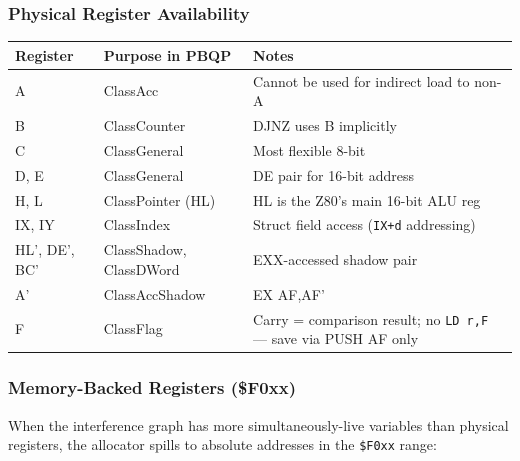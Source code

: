 \documentclass[
  11pt,
  a4paper,
]{report}
\begin{document}
\subsubsection{Physical Register
Availability}\label{physical-register-availability}

\begin{longtable}[]{@{}
  >{\raggedright\arraybackslash}p{}
  >{\raggedright\arraybackslash}p{}
  >{\raggedright\arraybackslash}p{}@{}}
\toprule\noalign{}
\begin{minipage}[b]{\linewidth}\raggedright
Register
\end{minipage} & \begin{minipage}[b]{\linewidth}\raggedright
Purpose in PBQP
\end{minipage} & \begin{minipage}[b]{\linewidth}\raggedright
Notes
\end{minipage} \\
\midrule\noalign{}
\endhead
\bottomrule\noalign{}
\endlastfoot
A & ClassAcc & Cannot be used for indirect load to non-A \\
B & ClassCounter & DJNZ uses B implicitly \\
C & ClassGeneral & Most flexible 8-bit \\
D, E & ClassGeneral & DE pair for 16-bit address \\
H, L & ClassPointer (HL) & HL is the Z80's main 16-bit ALU reg \\
IX, IY & ClassIndex & Struct field access (\texttt{IX+d} addressing) \\
HL', DE', BC' & ClassShadow, ClassDWord & EXX-accessed shadow pair \\
A' & ClassAccShadow & EX AF,AF' \\
F & ClassFlag & Carry = comparison result; no \texttt{LD\ r,F} --- save
via PUSH AF only \\
\end{longtable}

\subsubsection{Memory-Backed Registers
(\$F0xx)}\label{memory-backed-registers-f0xx}

When the interference graph has more simultaneously-live variables than
physical registers, the allocator spills to absolute addresses in the
\texttt{\$F0xx} range:
\end{document}
